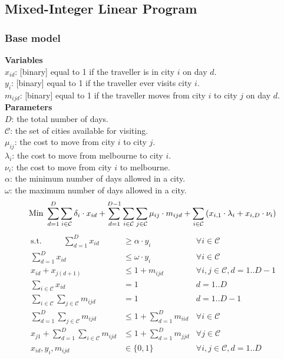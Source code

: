 \documentclass[12pt]{article}
\begin{document}
\pagebreak
\subsection{Mixed-Integer Linear Program}

\subsubsection{Base model}
\textbf{Variables} \\
$x_{id}$: [binary] equal to 1 if the traveller is in city $i$ on day $d$. \\ 	%
$y_{i}$: [binary] equal to 1 if the traveller ever visits city $i$. \\		%
$m_{ijd}$: [binary] equal to 1 if the traveller moves from city $i$ to city $j$ on day $d$. \\	%

\textbf{Parameters}\\
$D$: the total number of days. \\
$\mathcal{C}$: the set of cities available for visiting. \\
$\mu_{ij}$: the cost to move from city $i$ to city $j$. \\
$\lambda_{i}$: the cost to move from melbourne to city $i$. \\
$\nu_{i}$: the cost to move from city $i$ to melbourne. \\
$\alpha$: the minimum number of days allowed in a city. \\
$\omega$: the maximum number of days allowed in a city. \\
\begin{equation*}
\text{Min } \sum_{d=1}^{D} \sum_{i \in \mathcal{C}} \delta_{i} \cdot x_{id} + \sum_{d=1}^{D-1} \sum_{i \in \mathcal{C}} \sum_{j \in \mathcal{C}} \mu_{ij} \cdot m_{ijd} + \sum_{i \in \mathcal{C}} \left( x_{i,1} \cdot \lambda_{i} + x_{i,D} \cdot \nu_{i} \right)\\
\end{equation*}
\begin{align}
\text{s.t.~~~~~~~~} \sum_{d=1}^{D} x_{id} & \geq \alpha \cdot y_{i} & \forall i \in \mathcal{C}\\
\sum_{d=1}^{D} x_{id} & \leq \omega \cdot y_{i} &  \forall i \in \mathcal{C}\\
x_{id} + x_{j(d+1)} & \leq 1 + m_{ijd} & \forall i,j \in \mathcal{C}, d = 1..D-1 \\
\sum_{i \in \mathcal{C}} x_{id} &= 1 & d = 1..D \\
\sum_{i \in \mathcal{C}} \sum_{j \in \mathcal{C}} m_{ijd} &= 1 & d = 1..D-1 \\
\sum_{d=1}^{D} \sum_{j \in \mathcal{C}} m_{ijd} &\leq 1 + \sum_{d=1}^{D} m_{iid} & \forall i \in \mathcal{C} \\
x_{j1} + \sum_{d=1}^{D} \sum_{i \in \mathcal{C}} m_{ijd} &\leq 1 + \sum_{d=1}^{D} m_{jjd} & \forall j \in \mathcal{C}\\
x_{id}, y_{i}, m_{ijd} & \in \{0,1\} & \forall i, j \in \mathcal{C}, d = 1..D
\end{align}
\end{document}
